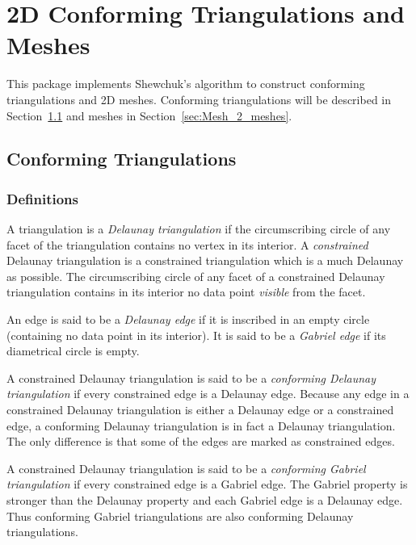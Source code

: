 \chapter{2D Conforming Triangulations and Meshes}
\label{user_chapter_2D_Meshes}



\minitoc

This package implements Shewchuk's algorithm \cite{s-mgdsa-00} to construct
conforming triangulations and 2D meshes. Conforming triangulations will be
described in Section~\ref{sec:Mesh_2_conforming_triangulation} and
meshes in Section~\ref{sec:Mesh_2_meshes}.

\section{Conforming Triangulations}
\label{sec:Mesh_2_conforming_triangulation}

\subsection{Definitions}
\label{sec:Mesh_2_conforming_definitions}

A triangulation is a \emph{Delaunay triangulation} if the circumscribing
circle of any facet of the triangulation contains no vertex in its
interior. A \emph{constrained} Delaunay triangulation is a constrained
triangulation which is a much Delaunay as possible. The circumscribing
circle of any facet of a constrained Delaunay triangulation contains in its
interior no data point \emph{visible} from the facet.

An edge is said to be a \emph{Delaunay edge} if it is inscribed in an empty
circle (containing no data point in its interior). It is said to be a
\emph{Gabriel edge} if its diametrical circle is empty.

A constrained Delaunay triangulation is said to be a \emph{conforming
  Delaunay triangulation} if every constrained edge is a Delaunay edge.
Because any edge in a constrained Delaunay triangulation is either a
Delaunay edge or a constrained edge, a conforming Delaunay triangulation is
in fact a Delaunay triangulation. The only difference is that some of the
edges are marked as constrained edges.

A constrained Delaunay triangulation is said to be a \emph{conforming
  Gabriel triangulation} if every constrained edge is a Gabriel edge. The
Gabriel property is stronger than the Delaunay property and each Gabriel
edge is a Delaunay edge. Thus conforming Gabriel triangulations are also
conforming Delaunay triangulations.

